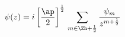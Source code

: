 \begin{equation}
\psi(z)=i\left[\frac{\ap}{2}\right]^{\frac12}\,
\sum_{m\in \Zh+\frac12}\frac{\psi_m}{z^{m+\frac12}}
\end{equation}

